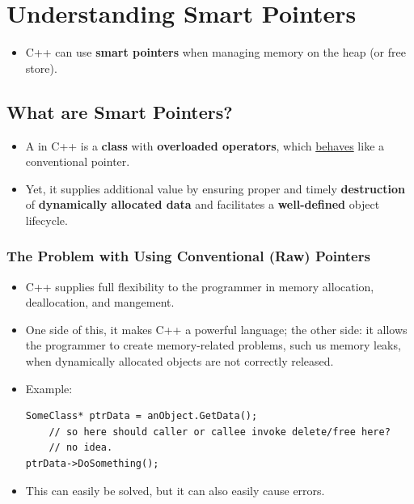 \documentclass[10pt]{article}
\newcommand{\pbreak}{\vspace{30pt}}
\newcommand{\vocab}[1]{\fbox{\textbf{\textit{#1}}}}
\begin{document}
\newpage
\section{Understanding Smart Pointers}
\begin{itemize}
	\item C++ can use \textbf{smart pointers} when managing memory on the heap (or free store).
\end{itemize}

\pbreak

\subsection{What are Smart Pointers?}
\begin{itemize}
	\item A \vocab{smart pointer} in C++ is a \textbf{class} with \textbf{overloaded operators}, which \underline{behaves} like a conventional pointer.

	\item Yet, it supplies additional value  by ensuring proper and timely \textbf{destruction} of \textbf{dynamically allocated data} and facilitates a \textbf{well-defined} object lifecycle.
\end{itemize}

\pbreak

\subsubsection{The Problem with Using Conventional (Raw) Pointers}
\begin{itemize}
	\item C++ supplies full flexibility to the programmer in memory allocation, deallocation, and mangement.

	\item One side of this, it makes C++ a powerful language; the other side: it allows the programmer to create memory-related problems, such us memory leaks, when dynamically allocated objects are not correctly released.

	\item Example:
		\begin{verbatim}
SomeClass* ptrData = anObject.GetData();
	// so here should caller or callee invoke delete/free here?
	// no idea.
ptrData->DoSomething();
		\end{verbatim}

	\item This can easily be solved, but it can also easily cause errors.
\end{itemize}
\end{document}
